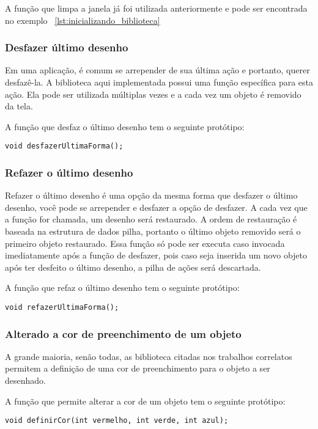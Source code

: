 \documentclass[12pt, %
openright,
oneside, %
a4paper,    %
brazil]{facom-ufu-abntex2}
\begin{document}
A função que limpa a janela já foi utilizada anteriormente e pode ser encontrada no exemplo ~\ref{lst:inicializando_biblioteca}

\subsubsection{Desfazer último desenho}
Em uma aplicação, é comum se arrepender de sua última ação e portanto, querer desfazê-la. A biblioteca aqui implementada possui uma função específica para esta ação. Ela pode ser utilizada múltiplas vezes e a cada vez um objeto é removido da tela.

A função que desfaz o último desenho tem o seguinte protótipo:

\begin{verbatim}
void desfazerUltimaForma();
\end{verbatim}

\subsubsection{Refazer o último desenho}
Refazer o último desenho é uma opção da mesma forma que desfazer o último desenho, você pode se arrepender e desfazer a opção de desfazer. A cada vez que a função for chamada, um desenho será restaurado. A ordem de restauração é baseada na estrutura de dados pilha, portanto o último objeto removido será o primeiro objeto restaurado. Essa função só pode ser executa caso invocada imediatamente após a função de desfazer, pois caso seja inserida um novo objeto após ter desfeito o último desenho, a pilha de ações será descartada.

A função que refaz o último desenho tem o seguinte protótipo:

\begin{verbatim}
void refazerUltimaForma();
\end{verbatim}

\subsubsection{Alterado a cor de preenchimento de um objeto} \label{api_definirCor}
A grande maioria, senão todas, as biblioteca citadas nos trabalhos correlatos permitem a definição de uma cor de preenchimento para o objeto a ser desenhado.

A função que permite alterar a cor de um objeto tem o seguinte protótipo:

\begin{verbatim}
void definirCor(int vermelho, int verde, int azul);
\end{verbatim}
\end{document}
